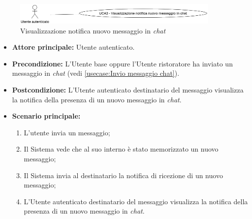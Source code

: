 \newpage
{}
\label{usecase:Visualizzazione notifica nuovo messaggio in chat}

\begin{figure}[h]
	\centering
	\includegraphics[width=0.9\textwidth]{./uml/UCA3.png} 
	\caption{Visualizzazione notifica nuovo messaggio in \textit{chat}}
	\label{fig:UCA3}
  \end{figure}

\begin{itemize}
    \item \textbf{Attore principale:} Utente autenticato.
	
	\item \textbf{Precondizione:} L'Utente base oppure l'Utente ristoratore ha inviato un messaggio in \textit{chat} (vedi \autoref{usecase:Invio messaggio chat}).

	\item \textbf{Postcondizione:} L'Utente autenticato destinatario del messaggio visualizza la notifica della presenza di un nuovo messaggio in \textit{chat}.
     
	\item \textbf{Scenario principale:}
	      \begin{enumerate}
                \item L'utente invia un messaggio;
                \item Il Sistema vede che al suo interno è stato memorizzato un nuovo messaggio;
                \item Il Sistema invia al destinatario la notifica di ricezione di un nuovo messaggio;
                \item L'Utente autenticato destinatario del messaggio visualizza la notifica della presenza di un nuovo messaggio in \textit{chat}.
	      \end{enumerate}
\end{itemize}